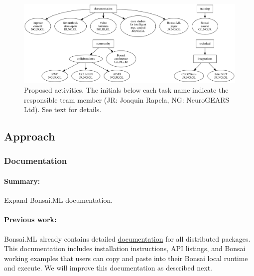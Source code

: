 
\begin{figure}
    \centering
    \includegraphics[width=6in]{activitiesGraphs/activities_larger.png}

    \caption{Proposed activities. The initials below each task name indicate
    the responsible team member (JR: Joaquin Rapela, NG: NeuroGEARS Ltd). See
    text for details.}

\end{figure}

\subsection*{Approach}

\subsubsection*{Documentation}

\paragraph{Summary:} Expand Bonsai.ML documentation.

\paragraph{Previous work:} Bonsai.ML already contains detailed
\href{https://bonsai-rx.org/machinelearning/index.html}{documentation} for all
distributed packages. This documentation includes installation instructions,
API listings, and Bonsai working examples that users can copy and paste into
their Bonsai local runtime and execute. We will improve this documentation as
described next.

